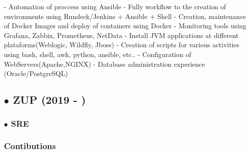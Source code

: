 \documentclass{article}
\begin{document}
- Automation of proccess using Ansible \newline
- Fully workflow to the creation of environments using Rundeck/Jenkins + Ansible + Shell \newline
- Creation, maintenance of Docker Images and deploy of containers using Docker \newline
- Monitoring tools using Grafana, Zabbix, Prometheus, NetData \newline
- Install JVM applications at different plataforms(Weblogic, Wildfly, Jboss) \newline
- Creation of scripts for various activities using bash, shell, awk, python, ansible, etc.. \newline
- Configuration of WebServers(Apache,NGINX) \newline
- Database administration experience (Oracle/PostgreSQL) \newline

\subsection{$\bullet$ ZUP (2019 - )}

\subsubsection{$\bullet$ SRE}

\subsubsection{Contibutions \\}
\end{document}
